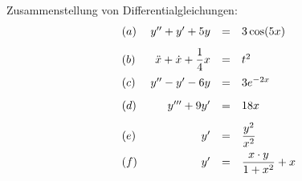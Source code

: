 \documentclass[a4paper, 10pt]{article}
\begin{document}
{
	Zusammenstellung von Differentialgleichungen:
	\begin{eqnarray*}
		\begin{array}{l r c l}
			(a) \, & y'' + y' + 5 y &=& 3\cos(5x)  \\[2ex]
			(b) \, & \ddot x + \dot x  + \dfrac14 x &=& t^2 \\[2ex]
			(c) \, & y'' - y' - 6 y &=& 3 e^{-2x} \\[2ex]
			(d) \, & y''' + 9 y' &=& 18 x \\[2ex]
			(e) \, & y' &=& \dfrac{y^2}{x^2} \\[2ex]
			(f) \, & y' &=& \dfrac{x\cdot y}{1+x^2}+x
	\end{array}
	\end{eqnarray*}

}
\end{document}
